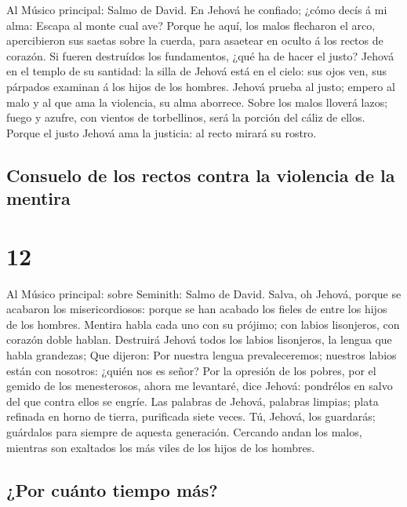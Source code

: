  Al Músico principal: Salmo de David. En Jehová he
confiado; ¿cómo decís á mi alma: Escapa al monte cual ave?
 Porque he aquí, los malos flecharon el arco, apercibieron
sus saetas sobre la cuerda, para asaetear en oculto á los rectos de
corazón.  Si fueren destruídos los fundamentos, ¿qué ha de
hacer el justo?  Jehová en el templo de su santidad: la
silla de Jehová está en el cielo: sus ojos ven, sus párpados examinan á
los hijos de los hombres.  Jehová prueba al justo; empero
al malo y al que ama la violencia, su alma aborrece. 
Sobre los malos lloverá lazos; fuego y azufre, con vientos de
torbellinos, será la porción del cáliz de ellos.  Porque
el justo Jehová ama la justicia: al recto mirará su rostro.

\hypertarget{consuelo-de-los-rectos-contra-la-violencia-de-la-mentira}{%
\subsection{Consuelo de los rectos contra la violencia de la
mentira}\label{consuelo-de-los-rectos-contra-la-violencia-de-la-mentira}}

\hypertarget{section-11}{%
\section{12}\label{section-11}}

 Al Músico principal: sobre Seminith: Salmo de David.
Salva, oh Jehová, porque se acabaron los misericordiosos: porque se han
acabado los fieles de entre los hijos de los hombres. 
Mentira habla cada uno con su prójimo; con labios lisonjeros, con
corazón doble hablan.  Destruirá Jehová todos los labios
lisonjeros, la lengua que habla grandezas;  Que dijeron:
Por nuestra lengua prevaleceremos; nuestros labios están con nosotros:
¿quién nos es señor?  Por la opresión de los pobres, por
el gemido de los menesterosos, ahora me levantaré, dice Jehová:
pondrélos en salvo del que contra ellos se engríe.  Las
palabras de Jehová, palabras limpias; plata refinada en horno de tierra,
purificada siete veces.  Tú, Jehová, los guardarás;
guárdalos para siempre de aquesta generación.  Cercando
andan los malos, mientras son exaltados los más viles de los hijos de
los hombres.

\hypertarget{por-cuuxe1nto-tiempo-muxe1s}{%
\subsection{¿Por cuánto tiempo más?}\label{por-cuuxe1nto-tiempo-muxe1s}}

